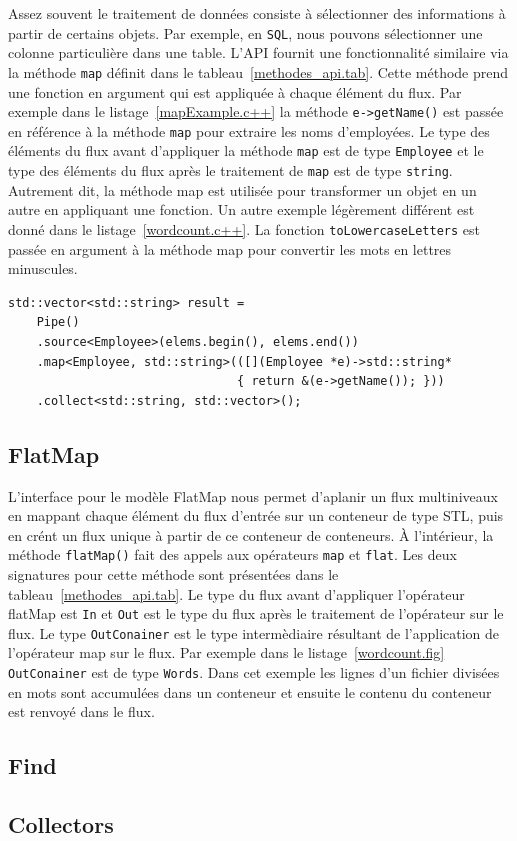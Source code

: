 Assez souvent le traitement de donn\'ees consiste \`a s\'electionner des informations \`a partir de certains objets. Par exemple, en \texttt{SQL}, nous pouvons s\'electionner une colonne particuli\`ere dans une table. L'API fournit une fonctionnalit\'e similaire via la m\'ethode \texttt{map} d\'efinit dans le tableau~\ref{methodes_api.tab}. Cette m\'ethode prend une fonction en argument qui est appliqu\'ee \`a chaque \'el\'ement du flux. Par exemple dans le listage~\ref{mapExample.c++} la m\'ethode \texttt{e->getName()} est pass\'ee en r\'ef\'erence \`a la m\'ethode \texttt{map} pour extraire  les noms d'employ\'ees. Le type des \'el\'ements du flux avant d'appliquer la m\'ethode \texttt{map} est de type \texttt{Employee} et le type des \'el\'ements du flux apr\`es le traitement de \texttt{map} est de type \texttt{string}. Autrement dit, la m\'ethode map est utilis\'ee pour transformer un objet en un autre en appliquant une fonction. Un autre exemple l\'eg\`erement diff\'erent est donn\'e dans le listage~\ref{wordcount.c++}. La fonction \texttt{toLowercaseLetters} est pass\'ee en argument \`a la m\'ethode map pour convertir les mots en lettres minuscules. 

\begin{Listing}[tbp]
\begin{lstlisting}
std::vector<std::string> result =
	Pipe()
	.source<Employee>(elems.begin(), elems.end())
	.map<Employee, std::string>(([](Employee *e)->std::string* 
        						{ return &(e->getName()); }))
	.collect<std::string, std::vector>();
\end{lstlisting}
\caption{Sàèelection d'une propri\'et\'e d'un objet \`a l'aide de map.}
\label{mapExample.c++}
\end{Listing}


\subsection{FlatMap}

L'interface pour le mod\`ele FlatMap nous permet d'aplanir un flux multiniveaux en mappant chaque \'el\'ement du flux d'entr\'ee sur un conteneur de type STL, puis en cr\'ent un flux unique \`a partir de ce conteneur de conteneurs. \`A l'int\'erieur, la m\'ethode \texttt{flatMap()} fait des appels aux op\'erateurs \texttt{map} et \texttt{flat}. Les deux signatures pour cette m\'ethode sont pr\'esent\'ees dans le tableau~\ref{methodes_api.tab}. Le type du flux avant d'appliquer l'op\'erateur flatMap est \texttt{In} et \texttt{Out} est le type du flux apr\`es le traitement de l'op\'erateur sur le flux. Le type \texttt{OutConainer} est le type interm\`ediaire r\'esultant de l'application de l'op\'erateur map sur le flux. Par exemple dans le listage~\ref{wordcount.fig} \texttt{OutConainer} est de type \texttt{Words}. Dans cet exemple les lignes d'un fichier divis\'ees en mots sont accumul\'ees dans un conteneur et ensuite le contenu du conteneur est renvoy\'e dans le flux.

\subsection{Find}

\subsection{Collectors}